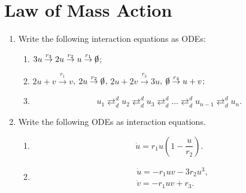 \documentclass[]{article}
\newcommand{\bb}{\begin{equation}}
\newcommand{\ee}{\end{equation}}
\renewcommand{\l}{\left(}
\renewcommand{\r}{\right)}
\begin{document}
\section{Law of Mass Action}
\begin{enumerate}
\item Write the following interaction equations as ODEs:
\begin{enumerate}
\item $3u\stackrel{r_3}{\rightarrow}2u\stackrel{r_2}{\rightarrow}u\stackrel{r_1}{\rightarrow}\slashed{0}$;
\item $2u+v\stackrel{r_1}{\rightarrow}v$, $2u\stackrel{r_2}{\rightarrow}\slashed{0}$, $2u+2v\stackrel{r_3}{\rightarrow}3u$, $\slashed{0}\stackrel{r_4}{\rightarrow}u+v$;
\item
\bb
u_1\mathrel{\mathop{\rightleftarrows}^{d}_{d}}u_2\mathrel{\mathop{\rightleftarrows}^{d}_{d}}u_3\mathrel{\mathop{\rightleftarrows}^{d}_{d}}\dots\mathrel{\mathop{\rightleftarrows}^{d}_{d}}u_{n-1}\mathrel{\mathop{\rightleftarrows}^{d}_{d}}u_n\nonumber.
\ee
\end{enumerate}

\item Write the following ODEs as interaction equations.
\begin{enumerate}
\item 
\bb
\dot{u}=r_1u\l 1- \frac{u}{r_2}\r\nonumber.
\ee
\item 
\begin{align}
&\dot{u}=-r_1uv-3r_2u^3,\nonumber\\
&\dot{v}=-r_1uv+r_3.\nonumber
\end{align}
\end{enumerate}
\end{enumerate}
\end{document}
